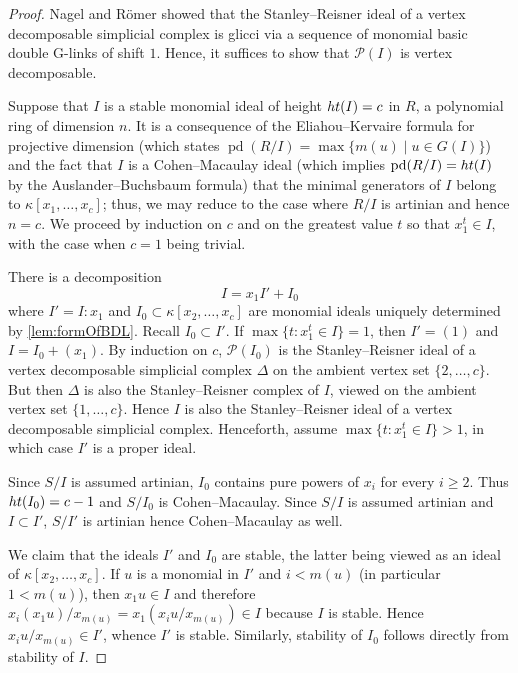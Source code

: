 \documentclass[12pt, reqno]{amsart}
\numberwithin{equation}{section}
\newtheorem{Main Conjecture}[theorem]{Main Conjecture}
\theoremstyle{definition}
\theoremstyle{plain}
\newcommand{\hgt}{{\rm{ht }}}
\renewcommand{\P}{\mathcal{P}}
\DeclareMathOperator{\pd}{pd}
\begin{document}
\begin{proof}
Nagel and R\"omer \cite[Theorem 3.3]{NR08} showed that the Stanley--Reisner ideal of a vertex decomposable simplicial complex is glicci via a sequence of monomial basic double G-links of shift $1$. Hence, it suffices to show that $\P(I)$ is vertex decomposable.

Suppose that $I$ is a stable monomial ideal of height $\hgt(I)=c$ in $R$, a polynomial ring of dimension $n$. It is a consequence of the Eliahou--Kervaire \cite{EK} formula for projective dimension (which states $\pd(R/I)=\max\{m(u)\mid u\in G(I)\}$) and the fact that $I$ is a Cohen--Macaulay ideal (which implies $\pd(R/I) = \hgt(I)$ by the Auslander--Buchsbaum formula) that the minimal generators of $I$ belong to $\kappa[x_1,\ldots,x_c]$; thus, we may reduce to the case where $R/I$ is artinian and hence $n=c$. We proceed by induction on $c$ and on the greatest value $t$ so that $x_1^t \in I$, with the case when $c=1$ being trivial. 

There is a decomposition 
\begin{equation}\label{eq:decomp}
I=x_1I'+I_0
\end{equation}
 where 
 $I'=I:x_1$ and $I_0 \subset \kappa[x_2,\ldots,x_c]$ are monomial ideals uniquely determined by \cref{lem:formOfBDL}. Recall $I_0\subset I'$. If $\max\{t \colon x_1^t \in I\} = 1$, then $I' = (1)$ and $I = I_0+(x_1)$. By induction on $c$, $\P(I_0)$ is the Stanley--Reisner ideal of a vertex decomposable simplicial complex $\Delta$ on the ambient vertex set $\{2,\ldots,c\}$. But then $\Delta$ is also the Stanley--Reisner complex of $I$, viewed on the ambient vertex set $\{1,\ldots,c\}$. Hence $I$ is also the Stanley--Reisner ideal of a vertex decomposable simplicial complex. Henceforth, assume $\max\{t \colon x_1^t \in I\}>1$, in which case $I'$ is a proper ideal.

 Since $S/I$ is assumed artinian, $I_0$ contains pure powers of $x_i$ for every $i\geq 2$.  Thus $\hgt(I_0)=c-1$ and $S/I_0$ is Cohen--Macaulay. Since $S/I$ is assumed artinian and $I\subset I'$, $S/I'$ is artinian hence Cohen--Macaulay as well.
 
 We claim that the ideals $I'$ and $I_0$ are stable, the latter being viewed as an ideal of $\kappa[x_2,\ldots,x_c]$.
If $u$ is a monomial in $I'$ and $i<m(u)$ (in particular $1<m(u)$), then $x_1u\in I$ and therefore $x_i(x_1u)/x_{m(u)}=x_1(x_iu/x_{m(u)})\in I$ because $I$ is stable. Hence $x_iu/x_{m(u)}\in I'$, whence $I'$ is stable. Similarly, stability of $I_0$ follows directly from stability of $I$.
 

\end{proof}
\end{document}
